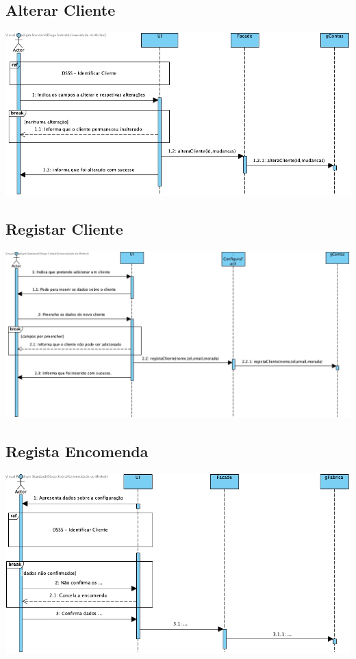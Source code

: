 \subsection{Alterar Cliente}
\begin{center}
 	\includegraphics[width = 5.5in]{DSSS/DSSS-Alterar_Cliente.jpg}
\end{center}

\subsection{Registar Cliente}
\begin{center}
 	\includegraphics[width = 5.5in]{DSSS/DSSS-Registar_Cliente.jpg}
\end{center}

\subsection{Regista Encomenda}
\begin{center}
 	\includegraphics[width = 5.5in]{DSSS/DSSS-Registar_Encomenda.jpg}
\end{center}

